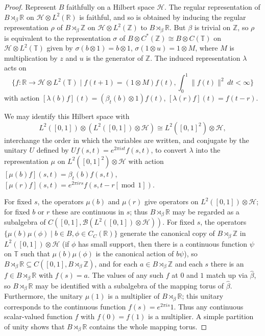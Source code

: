 \documentclass{book}
\begin{document}
\begin{proof}
  Represent \(B\) faithfully on a Hilbert space \(\mathcal{H}\). The regular representation
  of \(B\rtimes_\beta\mathbb{R}\) on \(\mathcal{H}\otimes L^2(\mathbb{R})\) is faithful, and so is obtained by inducing the regular representation \(\rho\)
  of \(B\rtimes_\beta\mathbb{Z}\) on \(\mathcal{H}\otimes L^2(\mathbb{Z})\) to \(B\rtimes_\beta\mathbb{R}\).
  But \(\beta\) is trivial on \(\mathbb{Z}\), so \(\rho\) is equivalent to the representation \(\sigma\) of \(B\otimes C^*(\mathbb{Z})\cong B\otimes C(\mathbb{T})\)
  on \(\mathcal{H}\otimes L^2(\mathbb{T})\) given by \(\sigma(b\otimes1)=b\otimes1\), \(\sigma(1\otimes u)=1\otimes M\), where \(M\) is 
  multiplication by \(z\) and \(u\) is the generator of \(\mathbb{Z}\). The induced representation \(\lambda\) acts on
  \[
    \{f:\mathbb{R}\to\mathcal{H}\otimes L^2(\mathbb{T})\mid f(t+1)=(1\otimes M)f(t), \int_0^1 \|f(t)\|^2\,dt<\infty\}
  \]
  with action \([\lambda(b)f](t)=(\beta_t(b)\otimes1)f(t)\), \([\lambda(r)f](t)=f(t-r)\).\par
  We may identify this Hilbert space with 
  \[
    L^2([0,1])\otimes(L^2([0,1])\otimes\mathcal{H})\cong L^2([0,1]^2)\otimes\mathcal{H},
  \]
  interchange the order in which the variables are written, and conjugate by the
  unitary \(U\) defined by \(Uf(s,t)=e^{2\pi ist}f(s,t)\), to convert \(\lambda\) into the representation
  \(\mu\) on \(L^2([0,1]^2)\otimes\mathcal{H}\) with action \([\mu(b)f](s,t)=\beta_t(b)f(s,t)\), \([\mu(r)f](s,t)=e^{2\pi irs}f(s,t-r[\operatorname{mod}\,1])\).\par
  For fixed \(s\), the operators \(\mu(b)\) and \(\mu(r)\) give operators on \(L^2([0,1])\otimes\mathcal{H}\);
  for fixed \(b\) or \(r\) these are continuous in \(s\); thus \(B\rtimes_\beta\mathbb{R}\) may be regarded
  as a subalgebra of \(C([0,1],\mathcal{B}(L^2([0,1])\otimes\mathcal{H}))\).
  For fixed \(s\), the operators \(\{\mu(b)\mu(\phi)\mid b\in B,\phi\in C_C(\mathbb{R})\}\) generate
  the canonical copy of \(B\rtimes_\beta\mathbb{Z}\) in \(L^2([0,1])\otimes\mathcal{H}\)
  (if \(\phi\) has small support, then there is a continuous function \(\psi\) on \(\mathbb{T}\) such that \(\mu(b)\mu(\phi)\) is
  the canonical action of \(b\psi\)), so \(B\rtimes_\beta\mathbb{R}\subseteq C([0,1],B\rtimes_\beta\mathbb{Z})\), and for each \(a\in B\rtimes_\beta\mathbb{Z}\)
  and each \(s\) there is an \(f\in B\rtimes_\beta\mathbb{R}\) with \(f(s)=a\). The values of any such 
  \(f\) at \(0\) and \(1\) match up via \(\hat{\beta}\), so \(B\rtimes_\beta\mathbb{R}\) may be identified with a subalgebra of the 
  mapping torus of \(\hat{\beta}\). Furthermore, the unitary \(\mu(1)\) is a multiplier of \(B\rtimes_\beta\mathbb{R}\);
  this unitary corresponds to the continuous function \(f(s)=e^{2\pi is}1\).
  Thus any continuous scalar-valued function \(f\) with \(f(0)=f(1)\) is a multiplier.
  A simple partition of unity shows that \(B\rtimes_\beta\mathbb{R}\) contains the whole mapping torus.
\end{proof}
\end{document}
